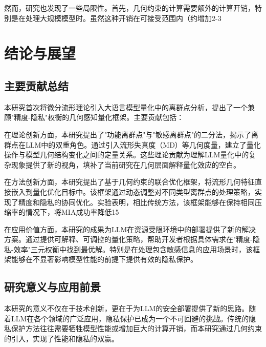 然而，研究也发现了一些局限性。首先，几何约束的计算需要额外的计算开销，特别是在处理大规模模型时。虽然这种开销在可接受范围内（约增加2-3%

\section{结论与展望}

\subsection{主要贡献总结}

本研究首次将微分流形理论引入大语言模型量化中的离群点分析，提出了一个兼顾"精度-隐私"权衡的几何感知量化框架。主要贡献包括：

在理论创新方面，本研究提出了"功能离群点"与"敏感离群点"的二分法，揭示了离群点在LLM中的双重角色。通过引入流形失真度（MD）等几何度量，建立了量化操作与模型几何结构变化之间的定量关系。这些理论贡献为理解LLM量化中的复杂现象提供了新的视角，填补了当前研究在几何层面解释量化效应的空白。

在方法创新方面，本研究提出了基于几何约束的联合优化框架，将流形几何特征直接嵌入到量化优化目标中。该框架通过动态调整对不同类型离群点的处理策略，实现了精度和隐私的协同优化。实验表明，相比传统方法，该框架能够在保持相同压缩率的情况下，将MIA成功率降低15%

在应用价值方面，本研究的成果为LLM在资源受限环境中的部署提供了新的解决方案。通过提供可解释、可调控的量化策略，帮助开发者根据具体需求在"精度-隐私-效率"三元权衡中找到最优解。特别是在处理包含敏感信息的应用场景时，该框架能够在不显著影响模型性能的前提下提供有效的隐私保护。

\subsection{研究意义与应用前景}

本研究的意义不仅在于技术创新，更在于为LLM的安全部署提供了新的思路。随着LLM在各个领域的广泛应用，隐私保护已成为一个不可回避的挑战。传统的隐私保护方法往往需要牺牲模型性能或增加巨大的计算开销，而本研究通过几何约束的引入，实现了性能和隐私的双赢。

